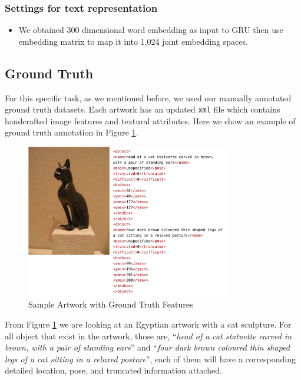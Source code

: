 \subsubsection{Settings for text representation}

\begin{itemize}
    \item We obtained 300 dimensional word embedding as input to GRU then use embedding matrix to map it into 1,024 joint embedding spaces.
\end{itemize}

\subsection{Ground Truth}

For this specific task, as we mentioned before, we used our manually annotated ground truth datasets. Each artwork has an updated \verb|xml| file which contains handcrafted image features and textural attributes. Here we show an example of ground truth annotation in Figure \ref{fig:sampledata}.

\begin{figure}[h!]
\centering
\includegraphics[width=0.8\textwidth]{sampledata.pdf}
\caption{Sample Artwork with Ground Truth Features}
\label{fig:sampledata}
\end{figure}

From Figure \ref{fig:sampledata} we are looking at an Egyptian artwork with a cat sculpture. For all object that exist in the artwork, those are, ``\textit{head of a    cat statuette carved in brown, with a pair of standing ears}'' and ``\textit{four dark brown coloured thin shaped legs of a cat sitting in a relaxed posture}'', each of them will have a corresponding detailed location, pose, and truncated information attached. 

